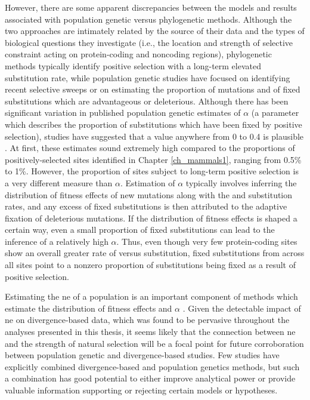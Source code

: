 However, there are some apparent discrepancies between the models and
results associated with population genetic versus phylogenetic
methods.  Although the two approaches are intimately related by the
source of their data and the types of biological questions they
investigate (i.e., the location and strength of selective constraint
acting on protein-coding and noncoding regions), phylogenetic methods
typically identify positive selection with a long-term elevated \nsyn
substitution rate, while population genetic studies have focused on
identifying recent selective sweeps or on estimating the proportion of
mutations and of fixed substitutions which are advantageous or
deleterious. Although there has been significant variation in
published population genetic estimates of $\alpha$ (a parameter which
describes the proportion of \nsyn substitutions which have been fixed
by positive selection), studies have suggested that a value anywhere
from 0 to 0.4 is plausible \citep{EyreWalker2009}. At first, these
estimates sound extremely high compared to the proportions of
positively-selected sites identified in Chapter \ref{ch_mammals1},
ranging from 0.5\% to 1\%. However, the proportion of sites subject to
long-term positive selection is a very different measure than
$\alpha$.  Estimation of $\alpha$ typically involves inferring the
distribution of fitness effects of new mutations along with the \nsyn
and \syn substitution rates, and any excess of fixed \nsyn
substitutions is then attributed to the adaptive fixation of
deleterious \nsyn mutations. If the distribution of fitness effects is
shaped a certain way, even a small proportion of fixed \nsyn
substitutions can lead to the inference of a relatively high
$\alpha$. Thus, even though very few protein-coding sites show an
overall greater rate of \nsyn versus \syn substitution, fixed \nsyn
substitutions from across all sites point to a nonzero proportion of
\nsyn substitutions being fixed as a result of positive selection.

Estimating the \ac{ne} of a population is an important component of
methods which estimate the distribution of fitness effects and
$\alpha$ \citep{EyreWalker2006,EyreWalker2009}. Given the detectable
impact of \ac{ne} on divergence-based data, which was found to be
pervasive throughout the analyses presented in this thesis, it seems
likely that the connection between \ac{ne} and the strength of natural
selection will be a focal point for future corroboration between
population genetic and divergence-based studies. Few studies have
explicitly combined divergence-based and population genetics methods,
but such a combination has good potential to either improve analytical
power or provide valuable information supporting or rejecting certain
models or hypotheses.

